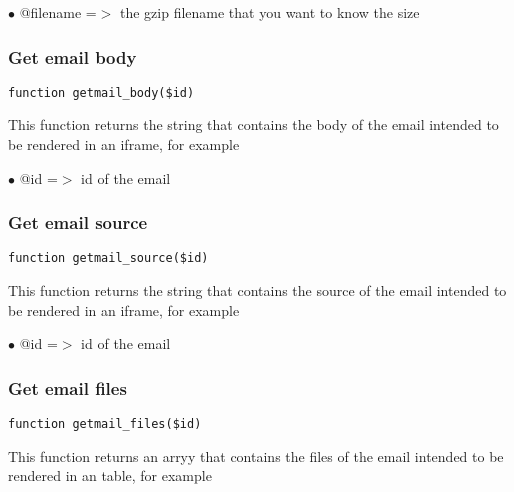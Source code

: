 \documentclass[a4paper]{article}
\begin{document}
\begin{compactitem}
\item[\color{myblue}$\bullet$] @filename =$>$ the gzip filename that you want to know the size
\end{compactitem}

\hypertarget{toc55}{}
\subsubsection{Get email body}

\begin{lstlisting}
function getmail_body($id)
\end{lstlisting}

This function returns the string that contains the body of the email
intended to be rendered in an iframe, for example

\begin{compactitem}
\item[\color{myblue}$\bullet$] @id =$>$ id of the email
\end{compactitem}

\hypertarget{toc56}{}
\subsubsection{Get email source}

\begin{lstlisting}
function getmail_source($id)
\end{lstlisting}

This function returns the string that contains the source of the email
intended to be rendered in an iframe, for example

\begin{compactitem}
\item[\color{myblue}$\bullet$] @id =$>$ id of the email
\end{compactitem}

\hypertarget{toc57}{}
\subsubsection{Get email files}

\begin{lstlisting}
function getmail_files($id)
\end{lstlisting}

This function returns an arryy that contains the files of the email
intended to be rendered in an table, for example
\end{document}
